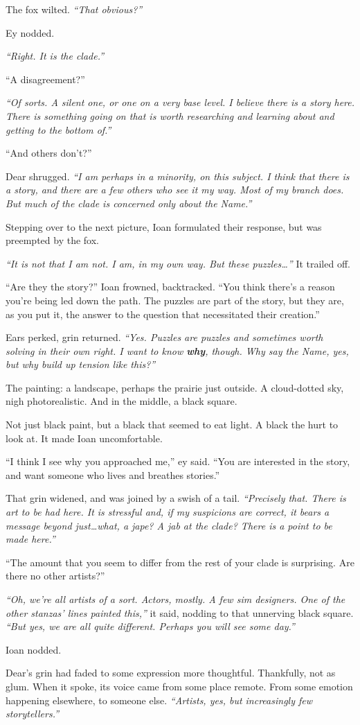 The fox wilted. \emph{``That obvious?''}

Ey nodded.

\emph{``Right. It is the clade.''}

``A disagreement?''

\emph{``Of sorts. A silent one, or one on a very base level. I believe there is a story here. There is something going on that is worth researching and learning about and getting to the bottom of.''}

``And others don't?''

Dear shrugged. \emph{``I am perhaps in a minority, on this subject. I think that there is a story, and there are a few others who see it my way. Most of my branch does. But much of the clade is concerned only about the Name.''}

Stepping over to the next picture, Ioan formulated their response, but was preempted by the fox.

\emph{``It is not that I am not. I am, in my own way. But these puzzles\ldots{}''} It trailed off.

``Are they the story?'' Ioan frowned, backtracked. ``You think there's a reason you're being led down the path. The puzzles are part of the story, but they are, as you put it, the answer to the question that necessitated their creation.''

Ears perked, grin returned. \emph{``Yes. Puzzles are puzzles and sometimes worth solving in their own right. I want to know \textbf{why}, though. Why say the Name, yes, but why build up tension like this?''}

The painting: a landscape, perhaps the prairie just outside. A cloud-dotted sky, nigh photorealistic. And in the middle, a black square.

Not just black paint, but a black that seemed to eat light. A black the hurt to look at. It made Ioan uncomfortable.

``I think I see why you approached me,'' ey said. ``You are interested in the story, and want someone who lives and breathes stories.''

That grin widened, and was joined by a swish of a tail. \emph{``Precisely that. There is art to be had here. It is stressful and, if my suspicions are correct, it bears a message beyond just\ldots{}what, a jape? A jab at the clade? There is a point to be made here.''}

``The amount that you seem to differ from the rest of your clade is surprising. Are there no other artists?''

\emph{``Oh, we're all artists of a sort. Actors, mostly. A few sim designers. One of the other stanzas' lines painted this,''} it said, nodding to that unnerving black square. \emph{``But yes, we are all quite different. Perhaps you will see some day.''}

Ioan nodded.

Dear's grin had faded to some expression more thoughtful. Thankfully, not as glum. When it spoke, its voice came from some place remote. From some emotion happening elsewhere, to someone else. \emph{``Artists, yes, but increasingly few storytellers.''}
